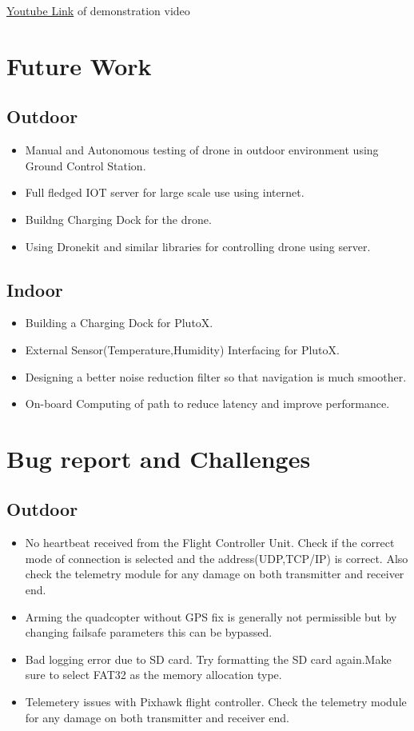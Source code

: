 \documentclass[a4paper,12pt,oneside]{book}
\begin{document}
\href{https://www.youtube.com/watch?v=DnNQvGCwf-I}{Youtube Link} of demonstration video 

\section{Future Work}
\subsection{Outdoor}
\begin{itemize}
\item Manual and Autonomous testing of drone in outdoor environment using Ground Control Station. 
\item Full fledged IOT server for large scale use using internet.
\item Buildng Charging Dock for the drone.
\item Using Dronekit and similar libraries for controlling drone using server.
\end{itemize}
\subsection{Indoor}
\begin{itemize}
\item Building a Charging Dock for PlutoX.
\item External Sensor(Temperature,Humidity) Interfacing for PlutoX.
\item Designing a better noise reduction filter so that navigation is much smoother.
\item On-board Computing of path to reduce latency and improve performance.
\end{itemize}

\section{Bug report and Challenges}
\subsection{Outdoor}
\begin{itemize}
\item No heartbeat received from the Flight Controller Unit. Check if the correct mode of connection is selected and the  address(UDP,TCP/IP) is correct. Also check the telemetry module for any damage on both transmitter and receiver end.
\item Arming the quadcopter without GPS fix is generally not permissible but by changing failsafe parameters this can be bypassed.
\item Bad logging error due to SD card. Try formatting the SD card again.Make sure to select FAT32 as the memory allocation type.
\item Telemetery issues with Pixhawk flight controller. Check the telemetry module for any damage on both transmitter and receiver end.
\end{itemize}
\end{document}
